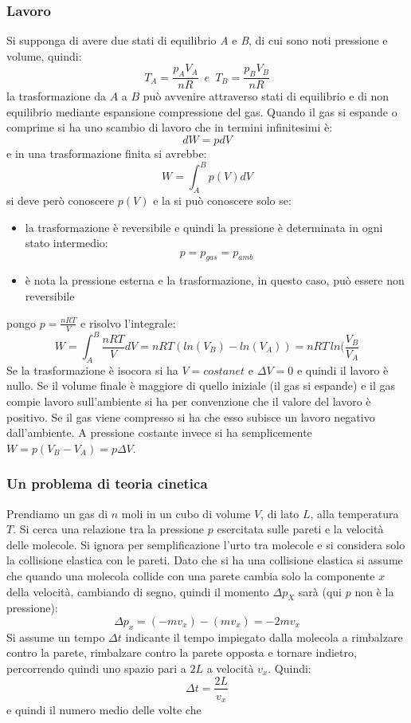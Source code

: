 \documentclass[a4paper,12pt, oneside]{book}
\begin{document}
\subsubsection{Lavoro}
Si supponga di avere due stati di equilibrio \textit{A} e \textit{B}, di cui sono noti pressione e volume, quindi:
$$T_A=\frac{p_AV_A}{nR}\,\,\,e\,\,\,T_B=\frac{p_BV_B}{nR}$$
la trasformazione da $A$ a $B$ può avvenire attraverso stati di equilibrio e di non equilibrio mediante espansione compressione del gas. Quando il gas si espande o comprime si ha uno scambio di lavoro che in termini infinitesimi è:
$$dW=pdV$$
e in una trasformazione finita si avrebbe:
$$W=\int_A^B p(V)dV$$
si deve però conoscere $p(V)$ e la si può conoscere solo se:
\begin{itemize}
	\item la trasformazione è reversibile e quindi la pressione è determinata in ogni stato intermedio:
	      $$p=p_{gas}=p_{amb}$$
	\item è nota la pressione esterna e la trasformazione, in questo caso, può essere non reversibile
\end{itemize}
pongo $p=\frac{nRT}{V}$ e risolvo l'integrale:
$$W=\int_A^B \frac{nRT}{V}dV=nRT(ln(V_B)-ln(V_A))=nRT\,ln(\frac{V_B}{V_A}$$
Se la trasformazione è isocora si ha $V=costanet$ e $\Delta V=0$ e quindi il lavoro è nullo. Se il volume finale è maggiore di quello iniziale (il gas si espande) e il gas compie lavoro sull'ambiente si ha per convenzione che il valore del lavoro è positivo. Se il gas viene compresso si ha che esso subisce un lavoro negativo dall'ambiente. A pressione costante invece si ha semplicemente $W=p(V_B-V_A)=p\Delta V$.

\subsubsection{Un problema di teoria cinetica}
Prendiamo un gas di $n$ moli in un cubo di volume $V$, di lato $L$, alla temperatura $T$. Si cerca una relazione tra la pressione $p$ esercitata sulle pareti e la velocità delle molecole. Si ignora per semplificazione l'urto tra molecole e si considera solo la collisione elastica con le pareti. Dato che si ha una collisione elastica si assume che quando una molecola collide con una parete cambia solo la componente $x$ della velocità, cambiando di segno, quindi il momento $\Delta p_X$ sarà (qui $p$ non è la pressione):
$$\Delta p_x=(-mv_x)-(mv_x)=-2mv_x$$
Si assume un tempo $\Delta t$ indicante il tempo impiegato dalla molecola a rimbalzare contro la parete, rimbalzare contro la parete opposta e tornare indietro, percorrendo quindi uno spazio pari a $2L$ a velocità $v_x$. Quindi:
$$\Delta t=\frac{2L}{v_x}$$
e quindi il numero medio delle volte che
\end{document}
